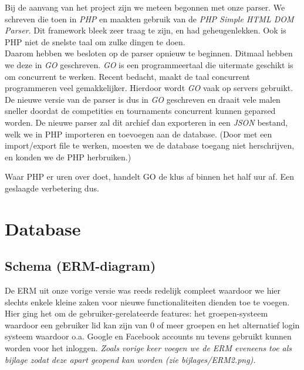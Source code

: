 \documentclass[11pt]{article}
\begin{document}
Bij de aanvang van het project zijn we meteen begonnen met onze parser. We schreven die toen in \emph{PHP} en maakten gebruik van de \emph{PHP Simple HTML DOM Parser}.
Dit framework bleek zeer traag te zijn, en had geheugenlekken. Ook is PHP niet de snelste taal om zulke dingen te doen.\\

Daarom hebben we besloten op de parser opnieuw te beginnen. Ditmaal hebben we deze in \emph{GO} geschreven. \emph{GO} is een programmeertaal die uitermate geschikt is om concurrent te werken. Recent bedacht, maakt de taal concurrent programmeren veel gemakkelijker. Hierdoor wordt \emph{GO} vaak op servers gebruikt.\\

De nieuwe versie van de parser is dus in \emph{GO} geschreven en draait vele malen sneller doordat de competities en tournaments concurrent kunnen geparsed worden. De nieuwe parser zal dit archief dan exporteren in een \emph{JSON} bestand, welk we in PHP importeren en toevoegen aan de database. (Door met een import/export file te werken, moesten we de database toegang niet herschrijven, en konden we de PHP herbruiken.)

Waar PHP er uren over doet, handelt GO de klus af binnen het half uur af. Een geslaagde verbetering dus. 




\section{Database}

\subsection{Schema (ERM-diagram)}

De ERM uit onze vorige versie was reeds redelijk compleet waardoor we hier slechts enkele kleine zaken voor nieuwe functionaliteiten dienden toe te voegen.\\
Hier ging het om de gebruiker-gerelateerde features: het groepen-systeem waardoor een gebruiker lid kan zijn van 0 of meer groepen en het alternatief login systeem waardoor o.a. Google en Facebook accounts nu tevens gebruikt kunnen worden voor het inloggen.  \emph{Zoals vorige keer voegen we de ERM eveneens toe als bijlage zodat deze apart geopend kan worden (zie bijlages/ERM2.png).}
\end{document}
